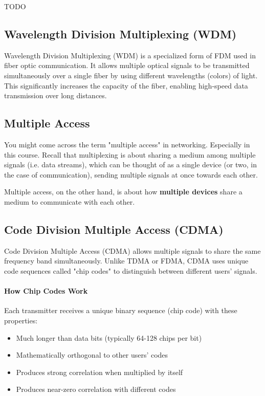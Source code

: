 TODO


\subsection{Wavelength Division Multiplexing (WDM)}
\label{subsec:wdm}

Wavelength Division Multiplexing (WDM) is a specialized form of FDM used in fiber optic communication. It allows multiple optical signals to be transmitted simultaneously over a single fiber by using different wavelengths (colors) of light. This significantly increases the capacity of the fiber, enabling high-speed data transmission over long distances.


\subsection{Multiple Access}
You might come across the term "multiple access" in networking. Especially in this course. Recall that multiplexing is about sharing a medium among multiple signals (i.e. data streams), which can be thought of as a single device (or two, in the case of communication), sending multiple signals at once towards each other.

\begin{importantblock}
    Multiple access, on the other hand, is about how \textbf{multiple devices} share a medium to communicate with each other.
\end{importantblock}

\subsection{Code Division Multiple Access (CDMA)}
\label{subsec:cdma}
Code Division Multiple Access (CDMA) allows multiple signals to share the same frequency band simultaneously. Unlike TDMA or FDMA, CDMA uses unique code sequences called "chip codes" to distinguish between different users' signals.

\paragraph{How Chip Codes Work}


Each transmitter receives a unique binary sequence (chip code) with these properties:
\begin{itemize}
    \item Much longer than data bits (typically 64-128 chips per bit)
    \item Mathematically orthogonal to other users' codes
    \item Produces strong correlation when multiplied by itself
    \item Produces near-zero correlation with different codes
\end{itemize}

